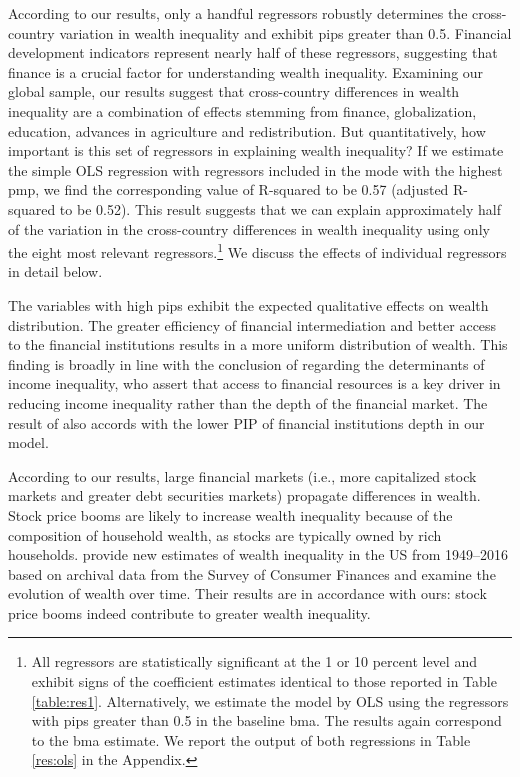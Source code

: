 \documentclass[a4paper,11pt]{article}
\begin{document}
According to our results, only a handful regressors robustly determines the cross-country variation in wealth inequality and exhibit \acp{pip} greater than 0.5. Financial development indicators represent nearly half of these regressors, suggesting that finance is a crucial factor for understanding wealth inequality. Examining our global sample, our results suggest that cross-country differences in wealth inequality are a combination of effects stemming from finance, globalization, education, advances in agriculture and redistribution. But quantitatively, how important is this set of regressors in explaining wealth inequality? If we estimate the simple OLS regression with regressors included in the mode with the highest \ac{pmp}, we find the corresponding value of R-squared to be 0.57 (adjusted R-squared to be 0.52). This result suggests that we can explain approximately half of the variation in the cross-country differences in wealth inequality using only the eight most relevant regressors.\footnote{All regressors are statistically significant at the 1 or 10 percent level and exhibit signs of the coefficient estimates identical to those reported in Table \ref{table:res1}. Alternatively, we estimate the model by OLS using the regressors with \acp{pip} greater than 0.5 in the baseline \ac{bma}. The results again correspond to the \ac{bma} estimate. We report the output of both regressions in Table \ref{res:ols} in the Appendix.} We discuss the effects of individual regressors in detail below.

The variables with high \acp{pip} exhibit the expected qualitative effects on wealth distribution. The greater efficiency of financial intermediation and better access to the financial institutions results in a more uniform distribution of wealth. This finding is broadly in line with the conclusion of \citet{claessens2007finance} regarding the determinants of income inequality, who assert that access to financial resources is a key driver in reducing income inequality rather than the depth of the financial market. The result of \citet{claessens2007finance} also accords with the lower PIP of financial institutions depth in our model. 

According to our results, large financial markets (i.e., more capitalized stock markets and greater debt securities markets) propagate differences in wealth. Stock price booms are likely to increase wealth inequality because of the composition of household wealth, as stocks are typically owned by rich households. \citet{kuhn} provide new estimates of wealth inequality in the US from 1949--2016 based on archival data from the Survey of Consumer Finances and examine the evolution of wealth over time. Their results are in accordance with ours: stock price booms indeed contribute to greater wealth inequality.  
\end{document}
